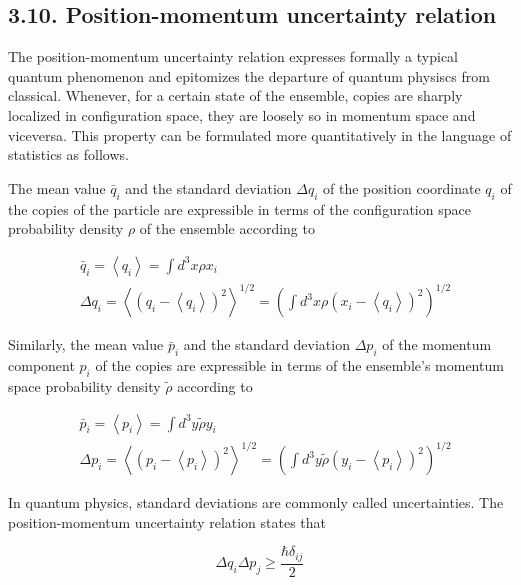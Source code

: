 \documentclass{article}
\begin{document}
\subsection*{3.10. Position-momentum uncertainty relation}

The position-momentum uncertainty relation expresses formally a typical quantum phenomenon and epitomizes the departure of quantum physiscs from classical. Whenever, for a certain state of the ensemble, copies are sharply localized in configuration space, they are loosely so in momentum space and viceversa. This property can be formulated more quantitatively in the language of statistics as follows.

The mean value $\bar{q}_{i}$ and the standard deviation $\Delta q_{i}$ of the position coordinate $q_{i}$ of the copies of the particle are expressible in terms of the configuration space probability density $\rho$ of the ensemble according to
 
\begin{align*}
& \bar{q}_{i}=\left\langle q_{i}\right\rangle=\int d^{3} x \rho x_{i}  \tag{3.10.1}\\
& \Delta q_{i}=\left\langle\left(q_{i}-\left\langle q_{i}\right\rangle\right)^{2}\right\rangle^{1 / 2}=\left(\int d^{3} x \rho\left(x_{i}-\left\langle q_{i}\right\rangle\right)^{2}\right)^{1 / 2} \tag{3.10.2}
\end{align*}
 

Similarly, the mean value $\bar{p}_{i}$ and the standard deviation $\Delta p_{i}$ of the momentum component $p_{i}$ of the copies are expressible in terms of the ensemble's momentum space probability density $\tilde{\rho}$ according to
 
\begin{align*}
& \bar{p}_{i}=\left\langle p_{i}\right\rangle=\int d^{3} y \tilde{\rho} y_{i}  \tag{3.10.3}\\
& \Delta p_{i}=\left\langle\left(p_{i}-\left\langle p_{i}\right\rangle\right)^{2}\right\rangle^{1 / 2}=\left(\int d^{3} y \tilde{\rho}\left(y_{i}-\left\langle p_{i}\right\rangle\right)^{2}\right)^{1 / 2} \tag{3.10.4}
\end{align*}
 

In quantum physics, standard deviations are commonly called uncertainties. The position-momentum uncertainty relation states that
 
\begin{equation*}
\Delta q_{i} \Delta p_{j} \geq \frac{\hbar \delta_{i j}}{2} \tag{3.10.5}
\end{equation*}
 
\end{document}
